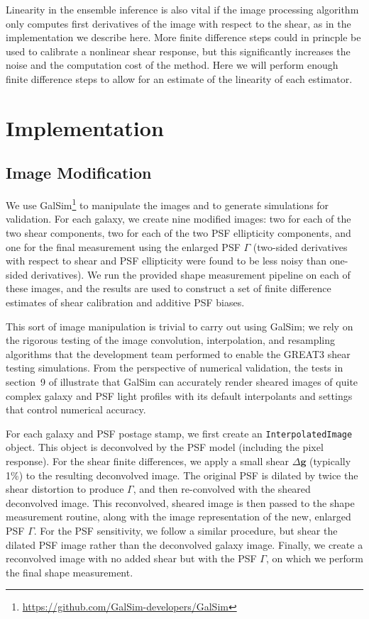 \documentclass[iop]{emulateapj}
\begin{document}
Linearity in the ensemble inference is also vital if the image
processing algorithm only computes first derivatives of the image with
respect to the shear, as in the implementation we describe here. More
finite difference steps could in princple be used to calibrate a
nonlinear shear response, but this significantly increases the noise
and the computation cost of the method. Here we will perform enough
finite difference steps to allow for an estimate of the linearity of
each estimator.


\section{Implementation}
\subsection{Image Modification}\label{subsec:imagemod}
We use
GalSim\footnote{\url{https://github.com/GalSim-developers/GalSim}} to
manipulate the images and to generate simulations for validation. For
each galaxy, we create nine modified images: two for each of the two
shear components, two for each of the two PSF ellipticity components,
and one for the final measurement using the enlarged PSF $\Gamma$
(two-sided derivatives with respect to shear and PSF ellipticity were
found to be less noisy than one-sided derivatives).  We run the
provided shape measurement pipeline on each of these images, and the
results are used to construct a set of finite difference estimates of
shear calibration and additive PSF biases.

This sort of image manipulation is trivial to carry out using GalSim;
we rely on the rigorous testing of the image convolution,
interpolation, and resampling algorithms that the development team
performed to enable the GREAT3 shear testing simulations.  From the
perspective of numerical validation, the tests in section~9 of
\cite{2015A&C....10..121R} illustrate that GalSim can accurately
render sheared images of quite complex galaxy and PSF light profiles
with its default interpolants and settings that control numerical accuracy.

For each galaxy and PSF postage stamp, we first create an
\texttt{InterpolatedImage} object. This object is deconvolved by the
PSF model (including the pixel response). For the shear finite
differences, we apply a small shear $\Delta\mathbf{g}$ (typically 1\%)
to the resulting deconvolved image. The original PSF is dilated by
twice the shear distortion to produce $\Gamma$, and then re-convolved
with the sheared deconvolved image. This reconvolved, sheared image is
then passed to the shape measurement routine, along with the image
representation of the new, enlarged PSF $\Gamma$. For the PSF
sensitivity, we follow a similar procedure, but shear the dilated PSF
image rather than the deconvolved galaxy image. Finally, we create a
reconvolved image with no added shear but with the PSF $\Gamma$, on
which we perform the final shape measurement.
\end{document}
